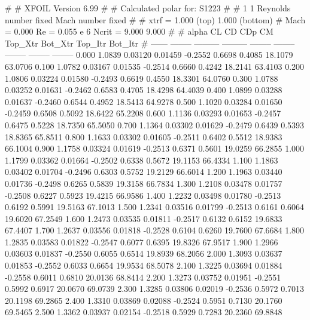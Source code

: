 #  
#       XFOIL         Version 6.99
#  
# Calculated polar for: S1223                                           
#  
# 1 1 Reynolds number fixed          Mach number fixed         
#  
# xtrf =   1.000 (top)        1.000 (bottom)  
# Mach =   0.000     Re =     0.055 e 6     Ncrit =   9.000  9.000
#  
#   alpha    CL        CD       CDp       CM     Top_Xtr  Bot_Xtr  Top_Itr  Bot_Itr
#  ------ -------- --------- --------- -------- -------- -------- -------- --------
   0.000   1.0839   0.03120   0.01459  -0.2552   0.6698   0.4085  18.1079  63.0706
   0.100   1.0782   0.03167   0.01535  -0.2514   0.6660   0.4242  18.2141  63.4103
   0.200   1.0806   0.03224   0.01580  -0.2493   0.6619   0.4550  18.3301  64.0760
   0.300   1.0788   0.03252   0.01631  -0.2462   0.6583   0.4705  18.4298  64.4039
   0.400   1.0899   0.03288   0.01637  -0.2460   0.6544   0.4952  18.5413  64.9278
   0.500   1.1020   0.03284   0.01650  -0.2459   0.6508   0.5092  18.6422  65.2208
   0.600   1.1136   0.03293   0.01653  -0.2457   0.6475   0.5228  18.7350  65.5050
   0.700   1.1364   0.03302   0.01629  -0.2479   0.6439   0.5393  18.8365  65.8511
   0.800   1.1633   0.03302   0.01605  -0.2511   0.6402   0.5512  18.9383  66.1004
   0.900   1.1758   0.03324   0.01619  -0.2513   0.6371   0.5601  19.0259  66.2855
   1.000   1.1799   0.03362   0.01664  -0.2502   0.6338   0.5672  19.1153  66.4334
   1.100   1.1863   0.03402   0.01704  -0.2496   0.6303   0.5752  19.2129  66.6014
   1.200   1.1963   0.03440   0.01736  -0.2498   0.6265   0.5839  19.3158  66.7834
   1.300   1.2108   0.03478   0.01757  -0.2508   0.6227   0.5923  19.4215  66.9586
   1.400   1.2232   0.03498   0.01780  -0.2513   0.6192   0.5991  19.5163  67.1013
   1.500   1.2341   0.03516   0.01799  -0.2513   0.6161   0.6064  19.6020  67.2549
   1.600   1.2473   0.03535   0.01811  -0.2517   0.6132   0.6152  19.6833  67.4407
   1.700   1.2637   0.03556   0.01818  -0.2528   0.6104   0.6260  19.7600  67.6684
   1.800   1.2835   0.03583   0.01822  -0.2547   0.6077   0.6395  19.8326  67.9517
   1.900   1.2966   0.03603   0.01837  -0.2550   0.6055   0.6514  19.8939  68.2056
   2.000   1.3093   0.03637   0.01853  -0.2552   0.6033   0.6654  19.9534  68.5078
   2.100   1.3225   0.03694   0.01884  -0.2558   0.6011   0.6810  20.0136  68.8414
   2.200   1.3273   0.03752   0.01951  -0.2551   0.5992   0.6917  20.0670  69.0739
   2.300   1.3285   0.03806   0.02019  -0.2536   0.5972   0.7013  20.1198  69.2865
   2.400   1.3310   0.03869   0.02088  -0.2524   0.5951   0.7130  20.1760  69.5465
   2.500   1.3362   0.03937   0.02154  -0.2518   0.5929   0.7283  20.2360  69.8848
